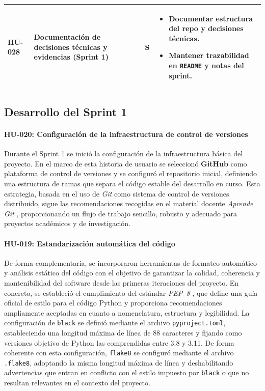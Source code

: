 \documentclass{report}
\begin{document}
\begin{table}[H]
\begin{tabular}{|l|p{4.2cm}|c|p{6.2cm}|}
HU-028 &
Documentación de decisiones técnicas y evidencias (Sprint 1) &
S &
\begin{itemize}\setlength\itemsep{0.2em}
  \item Documentar estructura del repo y decisiones técnicas.
  \item Mantener trazabilidad en \texttt{README} y notas del sprint.
\end{itemize}
\\ \hline

\end{tabular}
\end{table}
\subsection{Desarrollo del Sprint 1}

\paragraph{HU-020: Configuración de la infraestructura de control de versiones}
Durante el Sprint 1 se inició la configuración de la infraestructura básica del proyecto. En el marco de esta historia de usuario se seleccionó \textbf{GitHub} como plataforma de control de versiones y se configuró el repositorio inicial, definiendo una estructura de ramas que separa el código estable del desarrollo en curso. Esta estrategia, basada en el uso de \textit{Git} como sistema de control de versiones distribuido, sigue las recomendaciones recogidas en el material docente \emph{Aprende Git} \cite{aprendeGitUGR}, proporcionando un flujo de trabajo sencillo, robusto y adecuado para proyectos académicos y de investigación.

\paragraph{HU-019: Estandarización automática del código}
De forma complementaria, se incorporaron herramientas de formateo automático y análisis estático del código con el objetivo de garantizar la calidad, coherencia y mantenibilidad del software desde las primeras iteraciones del proyecto. En concreto, se estableció el cumplimiento del estándar \textit{PEP~8} \cite{pep8}, que define una guía oficial de estilo para el código Python y proporciona recomendaciones ampliamente aceptadas en cuanto a nomenclatura, estructura y legibilidad. La configuración de \texttt{black} se definió mediante el archivo \texttt{pyproject.toml}, estableciendo una longitud máxima de línea de 88 caracteres y fijando como versiones objetivo de Python las comprendidas entre 3.8 y 3.11. De forma coherente con esta configuración, \texttt{flake8} se configuró mediante el archivo \texttt{.flake8}, adoptando la misma longitud máxima de línea y deshabilitando advertencias que entran en conflicto con el estilo impuesto por \texttt{black} o que no resultan relevantes en el contexto del proyecto.
\end{document}
